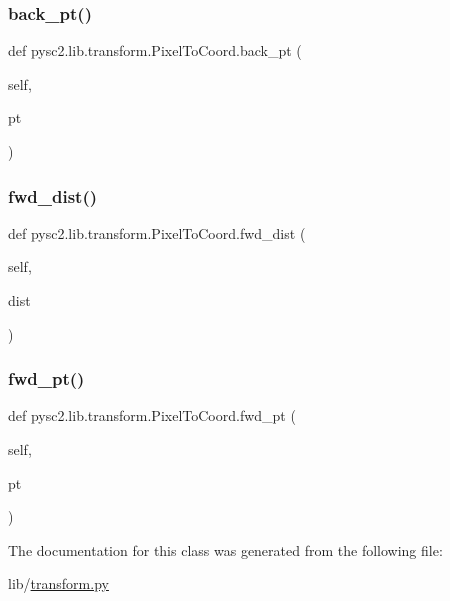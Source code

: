 \subsubsection{\texorpdfstring{back\+\_\+pt()}{back\_pt()}}
{\footnotesize\ttfamily def pysc2.\+lib.\+transform.\+Pixel\+To\+Coord.\+back\+\_\+pt (\begin{DoxyParamCaption}\item[{}]{self,  }\item[{}]{pt }\end{DoxyParamCaption})}

\mbox{\label{classpysc2_1_1lib_1_1transform_1_1_pixel_to_coord_a989286ec7cd07a77ad059ac5911189bb}} 
\subsubsection{\texorpdfstring{fwd\+\_\+dist()}{fwd\_dist()}}
{\footnotesize\ttfamily def pysc2.\+lib.\+transform.\+Pixel\+To\+Coord.\+fwd\+\_\+dist (\begin{DoxyParamCaption}\item[{}]{self,  }\item[{}]{dist }\end{DoxyParamCaption})}

\mbox{\label{classpysc2_1_1lib_1_1transform_1_1_pixel_to_coord_a3dd8a0723fc99be0e7a9f8718c6d27b7}} 
\subsubsection{\texorpdfstring{fwd\+\_\+pt()}{fwd\_pt()}}
{\footnotesize\ttfamily def pysc2.\+lib.\+transform.\+Pixel\+To\+Coord.\+fwd\+\_\+pt (\begin{DoxyParamCaption}\item[{}]{self,  }\item[{}]{pt }\end{DoxyParamCaption})}



The documentation for this class was generated from the following file\+:\begin{DoxyCompactItemize}
\item 
lib/\mbox{\hyperlink{transform_8py}{transform.\+py}}\end{DoxyCompactItemize}
